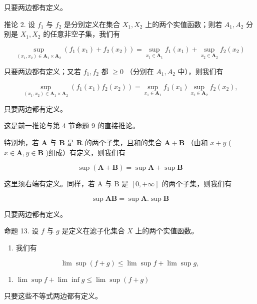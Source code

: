 只要两边都有定义。

推论 2. 设 \(f_{1}\) 与 \(f_{2}\) 是分别定义在集合 \(X_{1}, X_{2}\) 上的两个实值函数；则若 \(A_{1}, A_{2}\) 分别是 \(X_{1}, X_{2}\) 的任意非空子集，我们有

\[
\sup _ {(x _ {1}, x _ {2}) \in \mathbf {A} _ {1} \times \mathbf {A} _ {2}} (f _ {1} (x _ {1}) + f _ {2} (x _ {2})) = \sup _ {x _ {1} \in \mathbf {A} _ {1}} f _ {1} (x _ {1}) + \sup _ {x _ {2} \in \mathbf {A} _ {2}} f _ {2} (x _ {2})\tag{24}
\]

只要两边都有定义；又若 \(f_1, f_2\) 都 \(\geqslant 0\) （分别在 \(A_1, A_2\) 中），则我们有

\[
\sup _ {(x _ {1}, x _ {2}) \in \mathbf {A} _ {1} \times \mathbf {A} _ {2}} (f _ {1} (x _ {1}) f _ {2} (x _ {2})) = \sup _ {x _ {1} \in \mathbf {A} _ {1}} f _ {1} (x _ {1}) \sup _ {x _ {2} \in \mathbf {A} _ {2}} f _ {2} (x _ {2}),\tag{25}
\]

只要两边都有定义。

这是前一推论与第 4 节命题 9 的直接推论。

特别地，若 \(\mathbf{A}\) 与 \(\mathbf{B}\) 是 \(\overline{\mathbf{R}}\) 的两个子集，且和的集合 \(\mathbf{A} + \mathbf{B}\) （由和 \(x + y\) ( \(x \in \mathbf{A}, y \in \mathbf{B}\) )组成）有定义，则我们有

\[
\sup (\mathbf {A} + \mathbf {B}) = \sup \mathbf {A} + \sup \mathbf {B}\tag{26}
\]

这里须右端有定义。同样，若 A 与 B 是 \([0, +\infty]\) 的两个子集，则我们有

\[
\sup \mathbf {A B} = \sup \mathbf {A}. \sup \mathbf {B}\tag{27}
\]

只要两边都有定义。

命题 13. 设 \(f\) 与 \(g\) 是定义在滤子化集合 \(X\) 上的两个实值函数。

\begin{enumerate}
\def\labelenumi{(\roman{enumi})}
\tightlist
\item
  我们有
\end{enumerate}

\[
\lim \sup (f + g) \leqslant \lim \sup f + \lim \sup g, \tag {28}
\]

\begin{enumerate}
\def\labelenumi{(\arabic{enumi})}
\setcounter{enumi}{28}
\tightlist
\item
  \(\lim \sup f + \lim \inf g \leqslant \lim \sup (f + g)\)
\end{enumerate}

只要这些不等式两边都有定义。

